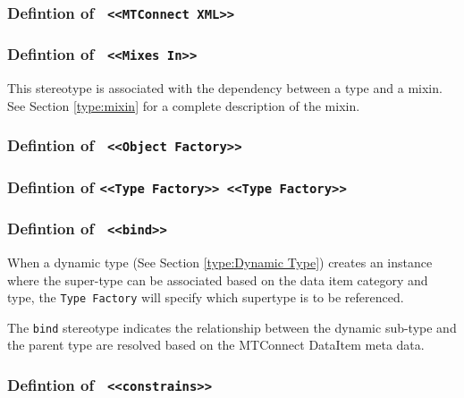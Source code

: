 \FloatBarrier
\subsubsection{Defintion of \texttt{ <<MTConnect XML>>}}
  \label{type:MTConnect XML}

\FloatBarrier
\FloatBarrier
\subsubsection{Defintion of \texttt{ <<Mixes In>>}}
  \label{type:Mixes In}

\FloatBarrier

This stereotype is associated with the dependency between a type and a mixin. See Section \ref{type:mixin} for a complete 
description of the mixin.

\FloatBarrier
\subsubsection{Defintion of \texttt{ <<Object Factory>>}}
  \label{type:Object Factory}

\FloatBarrier
\FloatBarrier
\subsubsection{Defintion of \texttt{<<Type Factory>> <<Type Factory>>}}
  \label{type:Type Factory}

\FloatBarrier
\FloatBarrier
\subsubsection{Defintion of \texttt{ <<bind>>}}
  \label{type:bind}

\FloatBarrier

When a dynamic type (See Section \ref{type:Dynamic Type}) creates an instance where the super-type
can be associated based on the data item category and type, the \texttt{Type Factory} will 
specify which supertype is to be referenced.

The \texttt{bind} stereotype indicates the relationship between the dynamic sub-type and the 
parent type are resolved based on the MTConnect DataItem meta data.

\FloatBarrier
\subsubsection{Defintion of \texttt{ <<constrains>>}}
  \label{type:constrains}

